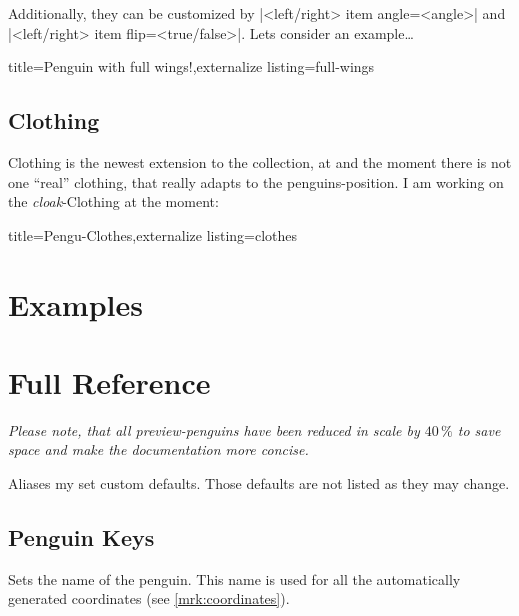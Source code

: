 \documentclass[parskip=half,english,numbers=noenddot,footnotes=nomultiple,oneside]{scrartcl}
\let\say\enquote
\def\lstfnsize{-.7}
\begin{document}
Additionally, they can be customized by |<left/right> item angle=<angle>| and |<left/right> item flip=<true/false>|.
Lets consider an example\ldots
\begin{tcblisting}{title={Penguin with full wings!},externalize listing=full-wings}
\begin{tikzpicture}[scale=.75]
	\pingu[lightsaber right=orange,
	  lollipop left,
	  right item angle=70,
	  right wing raise, left wing grab]
	\pingu[cane left, right item flip,
	  sign post right={Hi!}, xshift=35mm]
\end{tikzpicture}
\end{tcblisting}

\subsection{Clothing}
Clothing is the newest extension to the collection, at and the moment there is not one \say{real} clothing, that really adapts to the penguins-position.
I am working on the \textit{cloak}-Clothing at the moment:
\begin{tcblisting}{title={Pengu-Clothes},externalize listing=clothes}
\begin{tikzpicture}[scale=.75]
	\pingu[cloak]
\end{tikzpicture}
\end{tcblisting}

\section{Examples}

\appendix
\section{Full Reference}\label{sec:full-ref}

\begin{center}
	\textit{Please note, that all preview-penguins have been reduced in scale by \(40\,\%\) to save space and make the documentation more concise.}
\end{center}

Aliases my set custom defaults. Those defaults are not listed as they may change.

\def\lstfnsize{-1.65}

\subsection{Penguin Keys}
	Sets the name of the penguin. This name is used for all the automatically generated coordinates (see \autoref{mrk:coordinates}).
\endkeyexplain
\end{document}
